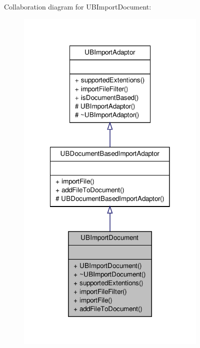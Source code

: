 Collaboration diagram for U\-B\-Import\-Document\-:
\nopagebreak
\begin{figure}[H]
\begin{center}
\leavevmode
\includegraphics[width=258pt]{da/d2c/class_u_b_import_document__coll__graph}
\end{center}
\end{figure}
